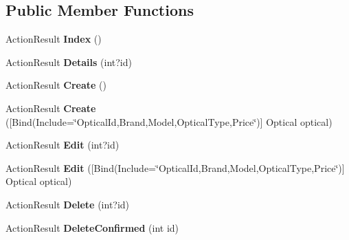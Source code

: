 \subsection*{Public Member Functions}
\begin{DoxyCompactItemize}
\item 
Action\+Result {\bfseries Index} ()\hypertarget{class_p_c_builder_m_v_c_1_1_controllers_1_1_optical_controller_a19d91c5c0eb4c6db44a9b52e49caa15c}{}\label{class_p_c_builder_m_v_c_1_1_controllers_1_1_optical_controller_a19d91c5c0eb4c6db44a9b52e49caa15c}

\item 
Action\+Result {\bfseries Details} (int?id)\hypertarget{class_p_c_builder_m_v_c_1_1_controllers_1_1_optical_controller_a451e9a21abefe7878228c4af97e42fb4}{}\label{class_p_c_builder_m_v_c_1_1_controllers_1_1_optical_controller_a451e9a21abefe7878228c4af97e42fb4}

\item 
Action\+Result {\bfseries Create} ()\hypertarget{class_p_c_builder_m_v_c_1_1_controllers_1_1_optical_controller_af5abe48aa5f880e392a1578c43e533a7}{}\label{class_p_c_builder_m_v_c_1_1_controllers_1_1_optical_controller_af5abe48aa5f880e392a1578c43e533a7}

\item 
Action\+Result {\bfseries Create} (\mbox{[}Bind(Include=\char`\"{}Optical\+Id,Brand,Model,Optical\+Type,Price\char`\"{})\mbox{]} Optical optical)\hypertarget{class_p_c_builder_m_v_c_1_1_controllers_1_1_optical_controller_a003bcc62793607ef4d4a79a7e821abcc}{}\label{class_p_c_builder_m_v_c_1_1_controllers_1_1_optical_controller_a003bcc62793607ef4d4a79a7e821abcc}

\item 
Action\+Result {\bfseries Edit} (int?id)\hypertarget{class_p_c_builder_m_v_c_1_1_controllers_1_1_optical_controller_ad97768ce3483ae9d4407f55ac1825221}{}\label{class_p_c_builder_m_v_c_1_1_controllers_1_1_optical_controller_ad97768ce3483ae9d4407f55ac1825221}

\item 
Action\+Result {\bfseries Edit} (\mbox{[}Bind(Include=\char`\"{}Optical\+Id,Brand,Model,Optical\+Type,Price\char`\"{})\mbox{]} Optical optical)\hypertarget{class_p_c_builder_m_v_c_1_1_controllers_1_1_optical_controller_a8a2ad0474ec18caed739167e1b535630}{}\label{class_p_c_builder_m_v_c_1_1_controllers_1_1_optical_controller_a8a2ad0474ec18caed739167e1b535630}

\item 
Action\+Result {\bfseries Delete} (int?id)\hypertarget{class_p_c_builder_m_v_c_1_1_controllers_1_1_optical_controller_a3ec1c51763dc146925d897e15fb3f33f}{}\label{class_p_c_builder_m_v_c_1_1_controllers_1_1_optical_controller_a3ec1c51763dc146925d897e15fb3f33f}

\item 
Action\+Result {\bfseries Delete\+Confirmed} (int id)\hypertarget{class_p_c_builder_m_v_c_1_1_controllers_1_1_optical_controller_aa88c8083a1bb937c87dc99359495b4d3}{}\label{class_p_c_builder_m_v_c_1_1_controllers_1_1_optical_controller_aa88c8083a1bb937c87dc99359495b4d3}

\end{DoxyCompactItemize}
